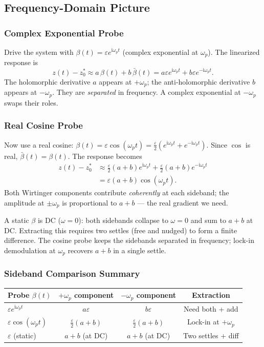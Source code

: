 \documentclass[11pt]{article}
\newcommand{\im}{\mathrm{i}}
\begin{document}
\subsection{Frequency-Domain Picture}

\subsubsection{Complex Exponential Probe}
Drive the system with $\beta(t) = \varepsilon e^{\im\omega_p t}$ (complex exponential at $\omega_p$). The linearized response is
\begin{equation}
z(t) - z_0^* \approx a\,\beta(t) + b\,\bar{\beta}(t)
= a\varepsilon e^{\im\omega_p t} + b\varepsilon e^{-\im\omega_p t}.
\end{equation}
The holomorphic derivative $a$ appears at $+\omega_p$; the anti-holomorphic derivative $b$ appears at $-\omega_p$. They are \emph{separated} in frequency. A complex exponential at $-\omega_p$ swaps their roles.

\subsubsection{Real Cosine Probe}
Now use a real cosine: $\beta(t) = \varepsilon \cos(\omega_p t) = \frac{\varepsilon}{2}(e^{\im\omega_p t} + e^{-\im\omega_p t})$. Since $\cos$ is real, $\bar{\beta}(t) = \beta(t)$. The response becomes
\begin{align}
z(t) - z_0^*
&\approx \frac{\varepsilon}{2}(a+b) e^{\im\omega_p t} + \frac{\varepsilon}{2}(a+b) e^{-\im\omega_p t} \\
&= \varepsilon(a+b)\cos(\omega_p t).
\end{align}
Both Wirtinger components contribute \emph{coherently} at each sideband; the amplitude at $\pm\omega_p$ is proportional to $a+b$ — the real gradient we need.

A static $\beta$ is DC ($\omega=0$): both sidebands collapse to $\omega=0$ and sum to $a+b$ at DC. Extracting this requires two settles (free and nudged) to form a finite difference. The cosine probe keeps the sidebands separated in frequency; lock-in demodulation at $\omega_p$ recovers $a+b$ in a single settle.

\subsubsection{Sideband Comparison Summary}

\begin{center}
\begin{tabular}{@{}lccc@{}}
\toprule
Probe $\beta(t)$ & $+\omega_p$ component & $-\omega_p$ component & Extraction \\
\midrule
$\varepsilon e^{\im\omega_p t}$ & $a\varepsilon$ & $b\varepsilon$ & Need both + add \\
$\varepsilon\cos(\omega_p t)$ & $\frac{\varepsilon}{2}(a+b)$ & $\frac{\varepsilon}{2}(a+b)$ & Lock-in at $+\omega_p$ \\
$\varepsilon$ (static) & $a+b$ (at DC) & $a+b$ (at DC) & Two settles + diff \\
\bottomrule
\end{tabular}
\end{center}
\end{document}
